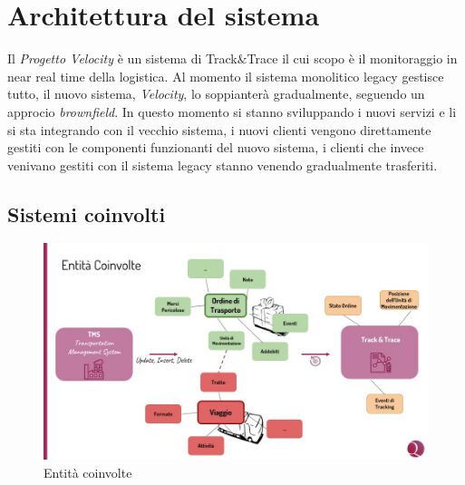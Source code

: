 \chapter{Architettura del sistema}
\label{ch:architecture}
Il \textit{Progetto Velocity} è un sistema di Track\&Trace il cui scopo è il monitoraggio in near real time della logistica.
Al momento il sistema monolitico legacy gestisce tutto, il nuovo sistema, \textit{Velocity}, lo soppianterà gradualmente, seguendo un approcio \textit{brownfield}.
In questo momento si stanno sviluppando i nuovi servizi e li si sta integrando con il vecchio sistema, i nuovi clienti vengono direttamente gestiti con le componenti
funzionanti del nuovo sistema, i clienti che invece venivano gestiti con il sistema legacy stanno venendo gradualmente trasferiti.

\section{Sistemi coinvolti}
\label{sec:architecture_entity}

\begin{figure}[H]
\centering
    \includegraphics[width=\textwidth]{images/architecture/entita_coinvolte.jpg}
    \caption{Entità coinvolte}
    \label{fig:architecture_entities_img}
\end{figure}

